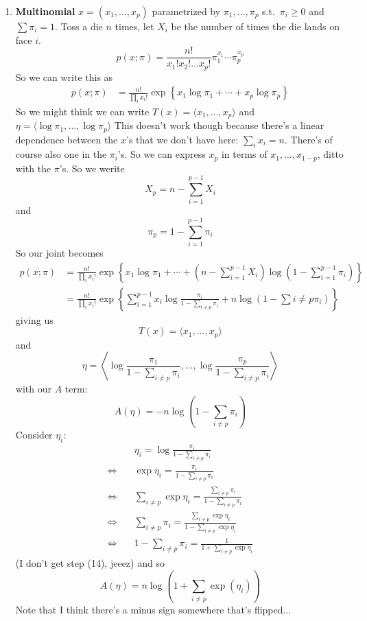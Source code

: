 \documentclass{article}
\begin{document}
\begin{enumerate}
	\item
	\textbf{Multinomial}
	$x = (x_1,\ldots,x_p)$
	parametrized by $\pi_1, \ldots, \pi_p$ s.t.\ $\pi_i\geq 0$ and $\sum \pi_i = 1$.
	Toss a die $n$ times, let $X_i$ be the number of times the die lands on face $i$.
	$$
	p(x;\pi) = 
	\frac{n!}
	{x_1!x_2!\ldots x_p!}
	\pi_1^{x_1}
	\cdots
	\pi_p^{x_p}
	$$
	So we can write this as
	\begin{align}
	p(x;\pi)
	&=
	\frac{n!}  {\prod_i x_i!}
	\exp
	\left\{
		x_1\log\pi_1 + \cdots + 
		x_p \log \pi_p
	\right\}
	\end{align}
	So we might think we can write
	$T(x) = \langle x_1, \ldots, x_p\rangle$
	and
	$\eta = \langle \log \pi_1 ,\ldots, \log\pi_p\rangle$
	This doesn't work though because there's a linear dependence between the $x$'s that we don't
	have here: $\sum_i x_i = n$.
	There's of course also one in the $\pi_i$'s.
	So we can express $x_p$ in terms of $x_1, \ldots, x_{1-p}$, ditto with the $\pi$'s.
	So we werite
	$$
	X_p = n - \sum_{i=1}^{p-1}X_i
	$$
	and
	$$
	\pi_p = 1 - \sum_{i=1}^{p-1}\pi_i
	$$
	So our joint becomes
	\begin{align}
	p(x;\pi)
	&=
	\frac{n!}  {\prod_i x_i!}
	\exp
	\left\{
		x_1\log\pi_1 + \cdots +
		\left(  n - \sum_{i=1}^{p-1}X_i \right)
		\log \left( 1 - \sum_{i=1}^{p-1}\pi_i \right)
	\right\}
	\\
	&=
	\frac{n!}  {\prod_i x_i!}
	\exp
	\left\{
		\sum_{i = 1}^{p-1}
		x_i\log \frac{\pi_i}{ 1 - \sum_{i\neq p} \pi_i}
		+
		n \log\left( 
		1 - \sum{i\neq p} \pi_i
		 \right)
	\right\}
	\end{align}
	giving us
	$$
	T(x) = \langle x_1, \ldots, x_p\rangle
	$$
	and
	$$
	\eta = 
	\left\langle
	\log \frac{\pi_1} {1 - \sum_{i\neq p} \pi_i}
	,
	\ldots
	,
	\log \frac{\pi_p} {1 - \sum_{i\neq p} \pi_i}
	\right\rangle
	$$
	with our $A$ term:
	$$
	A(\eta) =
	- n\log
	\left(
	1 - \sum_{i\neq p} \pi_i
	\right)
	$$
	Consider $\eta_i$:
	\begin{align}
	&
	\eta_i
	=
	\log
	\frac{\pi_i} {1 - \sum_{i\neq p} \pi_i}
	\\
	\Leftrightarrow \quad&
	\exp \eta_i
	=
	\frac{\pi_i} {1 - \sum_{i\neq p} \pi_i}
	\\
	\Leftrightarrow \quad&
	\sum_{i\neq p}
	\exp \eta_i
	=
	\frac{\sum_{i\neq p}\pi_i} {1 - \sum_{i\neq p} \pi_i}
	\\
	\Leftrightarrow \quad&
	\sum_{i\neq p}
	\pi_i
	=
	\frac{\sum_{i\neq p}\exp \eta_i} {1 - \sum_{i\neq p} \exp\eta_i}
	\\
	\Leftrightarrow \quad&
	1 - 
	\sum_{i\neq p}
	\pi_i
	=
	\frac{1} {1 + \sum_{i\neq p} \exp\eta_i}
	\end{align}
	(I don't get step (14), jeeez)
	and so
	$$
	A(\eta)
	=
	n \log \left(
	1 + \sum_{i\neq p} \exp(\eta_i)
	\right)
	$$
	Note that I think there's a minus sign somewhere that's flipped...
	

\end{enumerate}
\end{document}
